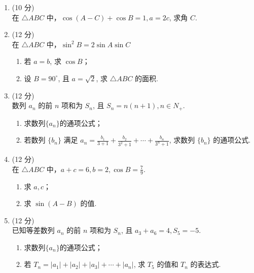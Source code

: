 \documentclass[17pt,twoside,space]{ctexart}
\begin{document}
\begin{enumerate}[itemsep=-0.3em,topsep=0pt,resume]%

\item (10 分)\\
在 $\triangle ABC$ 中，$\cos(A-C)+\cos B=1, a=2c$, 求角 $C$.

	\vspace{180pt}

\item (12 分)\\
在 $\triangle ABC$ 中，$\sin^2B=2\sin A\sin C$
    \begin{enumerate}[itemsep=-0.3em,label={(\arabic*)},topsep=0pt,labelsep=.5em,leftmargin=1.7em]
	\item 若 $a=b$, 求 $\cos B$；
	\item 设 $B=90^\circ$, 且 $a=\sqrt{2}$, 求 $\triangle ABC$ 的面积. 
	\end{enumerate}
	
\newpage

\item (12 分)\\
数列 $a_n$ 的前 $n$ 项和为 $S_n$, 且 $S_n=n(n+1), n\in N_+$. 
    \begin{enumerate}[itemsep=-0.3em,label={(\arabic*)},topsep=0pt,labelsep=.5em,leftmargin=1.7em]
	\item 求数列$\{a_n\}$的通项公式；
	\item 若数列 $\{b_n\}$ 满足 $a_n=\frac{b_1}{3+1}+\frac{b_2}{3^2+1}+\cdots+\frac{b_n}{3^n+1}$, 求数列 $\{b_n\}$ 的通项公式.
	\end{enumerate}

\vspace{250pt}

\item (12 分)\\
在 $\triangle ABC$ 中，$a+c=6, b=2, \cos B=\frac{7}{9}$.
	\begin{enumerate}[itemsep=-0.3em,label={(\arabic*)},topsep=0pt,labelsep=.5em,leftmargin=1.7em]
		\item 求 $a,c$；
		\item 求 $\sin(A-B)$ 的值. 
	\end{enumerate}

\newpage

\item (12 分)\\
已知等差数列 $a_n$ 的前 $n$ 项和为 $S_n$, 且 $a_3+a_6=4, S_5=-5$. 
    \begin{enumerate}[itemsep=-0.3em,label={(\arabic*)},topsep=0pt,labelsep=.5em,leftmargin=1.7em]
		\item 求数列$\{a_n\}$的通项公式；
		\item 若 $T_n=|a_1|+|a_2|+|a_3|+\cdots+|a_n|$, 求 $T_5$ 的值和 $T_n$ 的表达式.
	\end{enumerate}


\end{enumerate}
\end{document}
